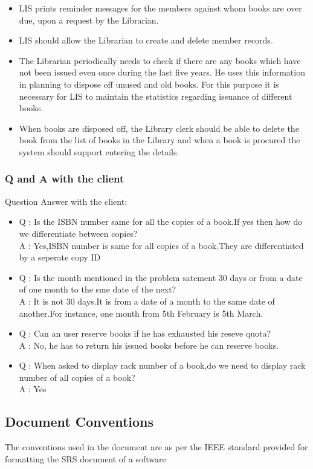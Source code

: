 \documentclass{article}
\begin{document}
\begin{itemize}
\item LIS prints reminder messages for the members against whom books are over due, upon a request by the
Librarian.
\item LIS should allow the Librarian to create and delete member records.
\item The Librarian periodically needs to check if there are any books which have not been issued even once
during the last five years. He uses this information in planning to dispose off unused and old books. For
this purpose it is necessary for LIS to maintain the statistics regarding issuance of different books.
\item When books are disposed off, the Library clerk should be able to delete the book from the list of books
in the Library and when a book is procured the system should support entering the details.
\end{itemize}

\subsubsection*{Q and A with the client}
Question Answer with the client:
\begin{itemize}
\item Q : Is the ISBN number same for all the copies of a book.If yes then how do we differentiate between copies?
\\A : Yes,ISBN number is same for all copies of a book.They are differentiated by a seperate copy ID

\item Q : Is the month mentioned in the problem satement 30 days or from a date of one month to the sme date of the next?
\\A : It is not 30 days.It is from a date of a month to the same date of another.For instance, one month from 5th February is 5th March.

\item Q : Can an user reserve books if he has exhausted his reseve quota?
\\A : No, he has to return his issued books before he can reserve books.

\item Q : When asked to display rack number of a book,do we need to display rack number of all copies of a book?
\\A : Yes
\end{itemize}
\subsection{Document Conventions}
The conventions used in the document are as per the IEEE standard provided for formatting the SRS document of a software
\end{document}

